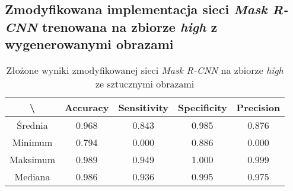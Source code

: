 \subsection{Zmodyfikowana implementacja sieci \textit{Mask R-CNN} trenowana na zbiorze \textit{high} z wygenerowanymi obrazami}

\begin{table}[H]
	\centering
	\caption{Złożone wyniki zmodyfikowanej sieci \textit{Mask R-CNN} na zbiorze \textit{high} ze sztucznymi obrazami}
	\vspace{6pt}
	{\footnotesize
		\begin{tabular}{|c|c|c|c|c|}
      \hline \textbackslash & Accuracy & Sensitivity & Specificity & Precision \\
      \hline Średnia & 0.968 & 0.843 & 0.985 & 0.876 \\
      \hline Minimum & 0.794 & 0.000 & 0.886 & 0.000 \\
      \hline Maksimum & 0.989 & 0.949 & 1.000 & 0.999 \\
      \hline Mediana & 0.986 & 0.936 & 0.995 & 0.975 \\
      \hline
		\end{tabular}
	}
  \vspace{0pt}
  \label{Tab:high_modified_generated_calculated}
\end{table}

